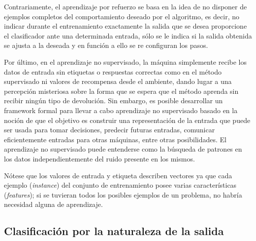 Contrariamente, el aprendizaje por refuerzo se basa en la idea de
no disponer de ejemplos completos del comportamiento deseado por el
algoritmo, es decir, no indicar durante el entrenamiento exactamente
la salida que se desea proporcione el clasificador ante una determinada
entrada, sólo se le indica si la salida obtenida se ajusta a la deseada
y en función a ello se re configuran los pasos. 

Por último, en el aprendizaje \cite{Ghahramani2004} no supervisado,
la máquina simplemente recibe los datos de entrada sin etiquetas o
respuestas correctas como en el método supervisado ni valores de recompensa
desde el ambiente, dando lugar a una percepción misteriosa sobre la
forma que se espera que el método aprenda sin recibir ningún tipo
de devolución. Sin embargo, es posible desarrollar un framework formal
para llevar a cabo aprendizaje no supervisado basado en la noción
de que el objetivo es construir una representación de la entrada que
puede ser usada para tomar decisiones, predecir futuras entradas,
comunicar eficientemente entradas para otras máquinas, entre otras
posibilidades. El aprendizaje no supervisado puede entenderse como
la búsqueda de patrones en los datos independientemente del ruido
presente en los mismos. 

Nótese que los valores de entrada y etiqueta describen vectores ya
que cada ejemplo (\emph{instance}) del conjunto de entrenamiento posee
varias características (\emph{features}); si se tuvieran todos los
posibles ejemplos de un problema, no habría necesidad alguna de aprendizaje.


\subsection{Clasificación por la naturaleza de la salida}


